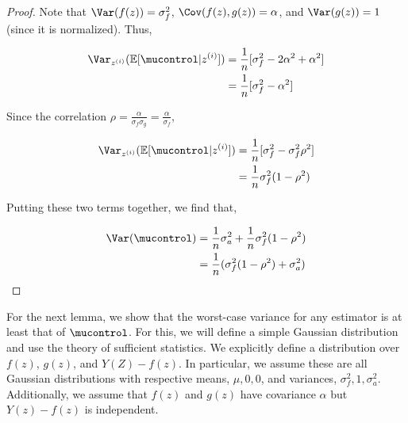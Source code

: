 \begin{proof}
Note that $\Var(f(z))=\sigma^2_f$, $\Cov(f(z),g(z))=\alpha$, and $\Var(g(z))=1$ (since it is normalized). Thus,

\begin{align}
\Var_{z^{(i)}}( \mathbb{E}[\mucontrol | z^{(i)}]) &= \frac{1}{n} [\sigma^2_f - 2 \alpha^2 + \alpha^2] \\
&=\frac{1}{n} [\sigma^2_f - \alpha^2]
\end{align}

Since the correlation $\rho = \frac{\alpha}{\sigma_f \sigma_g} = \frac{\alpha}{\sigma_f}$,

\begin{align}
\Var_{z^{(i)}}( \mathbb{E}[\mucontrol | z^{(i)}]) &= \frac{1}{n} [\sigma^2_f - \sigma^2_f \rho^2] \\
&=\frac{1}{n} \sigma^2_f (1-\rho^2)
\end{align}

Putting these two terms together, we find that,

\begin{align}
\Var(\mucontrol) &= \frac{1}{n} \sigma^2_a + \frac{1}{n} \sigma^2_f (1-\rho^2) \\
&= \frac{1}{n}(\sigma^2_f (1 - \rho^2) + \sigma^2_a)
\end{align}
\end{proof}

For the next lemma, we show that the worst-case variance for any estimator is at least that of $\mucontrol$. For this, we will define a simple Gaussian distribution and use the theory of sufficient statistics. We explicitly define a distribution over $f(z)$, $g(z)$, and $Y(Z) - f(z)$. In particular, we assume these are all Gaussian distributions with respective means, $\mu, 0, 0$,  and variances, $\sigma^2_f, 1, \sigma^2_a$. Additionally, we assume that $f(z)$ and $g(z)$ have covariance $\alpha$ but $Y(z) - f(z)$ is independent.

